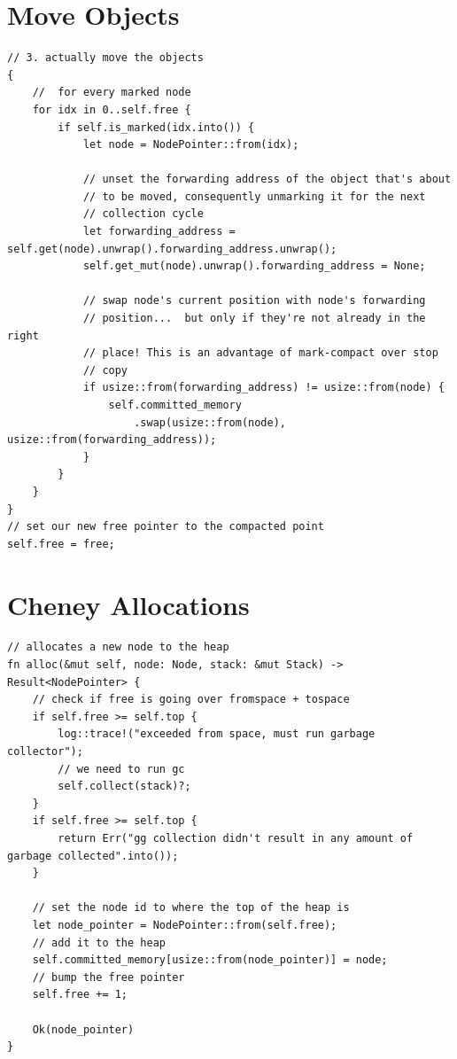 \documentclass[index]{subfiles}
\begin{document}
\section{Move Objects}
\begin{verbatim}
// 3. actually move the objects
{
    //  for every marked node
    for idx in 0..self.free {
        if self.is_marked(idx.into()) {
            let node = NodePointer::from(idx);

            // unset the forwarding address of the object that's about
            // to be moved, consequently unmarking it for the next
            // collection cycle
            let forwarding_address = self.get(node).unwrap().forwarding_address.unwrap();
            self.get_mut(node).unwrap().forwarding_address = None;

            // swap node's current position with node's forwarding
            // position...  but only if they're not already in the right
            // place! This is an advantage of mark-compact over stop
            // copy
            if usize::from(forwarding_address) != usize::from(node) {
                self.committed_memory
                    .swap(usize::from(node), usize::from(forwarding_address));
            }
        }
    }
}
// set our new free pointer to the compacted point
self.free = free;
\end{verbatim}

\section{Cheney Allocations}
\begin{verbatim}
// allocates a new node to the heap
fn alloc(&mut self, node: Node, stack: &mut Stack) -> Result<NodePointer> {
    // check if free is going over fromspace + tospace
    if self.free >= self.top {
        log::trace!("exceeded from space, must run garbage collector");
        // we need to run gc
        self.collect(stack)?;
    }
    if self.free >= self.top {
        return Err("gg collection didn't result in any amount of garbage collected".into());
    }

    // set the node id to where the top of the heap is
    let node_pointer = NodePointer::from(self.free);
    // add it to the heap
    self.committed_memory[usize::from(node_pointer)] = node;
    // bump the free pointer
    self.free += 1;

    Ok(node_pointer)
}
\end{verbatim}
\end{document}
